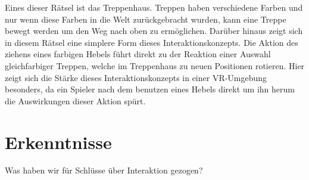 Eines dieser Rätsel ist das Treppenhaus. Treppen haben verschiedene Farben und nur wenn diese Farben in die Welt zurückgebracht wurden, kann eine Treppe bewegt werden um den Weg nach oben zu ermöglichen. Darüber hinaus zeigt sich in diesem Rätsel eine simplere Form dieses Interaktionskonzepts. Die Aktion des ziehens eines farbigen Hebels führt direkt zu der Reaktion einer Auswahl gleichfarbiger Treppen, welche im Treppenhaus zu neuen Positionen rotieren. Hier zeigt sich die Stärke dieses Interaktionskonzepts in einer VR-Umgebung besonders, da ein Spieler nach dem benutzen eines Hebels direkt um ihn herum die Auswirkungen dieser Aktion spürt.


\section{Erkenntnisse}
Was haben wir für Schlüsse über Interaktion gezogen? 